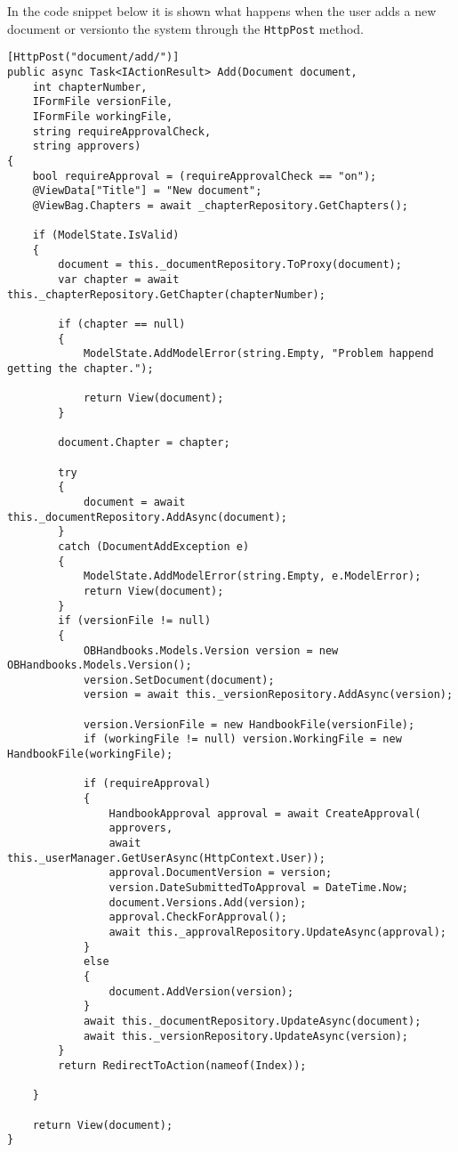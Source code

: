 In the code snippet below it is shown what happens when the user adds a new document or versionto the system through the \texttt{HttpPost} method.
\\
\begin{lstlisting}
[HttpPost("document/add/")]
public async Task<IActionResult> Add(Document document,
	int chapterNumber,
	IFormFile versionFile,
	IFormFile workingFile,
	string requireApprovalCheck,
	string approvers)
{
	bool requireApproval = (requireApprovalCheck == "on");
	@ViewData["Title"] = "New document";
	@ViewBag.Chapters = await _chapterRepository.GetChapters();

	if (ModelState.IsValid)
	{
		document = this._documentRepository.ToProxy(document);
		var chapter = await this._chapterRepository.GetChapter(chapterNumber);

		if (chapter == null)
		{
			ModelState.AddModelError(string.Empty, "Problem happend getting the chapter.");

			return View(document);
		}

		document.Chapter = chapter;

		try
		{
			document = await this._documentRepository.AddAsync(document);
		}
		catch (DocumentAddException e)
		{
			ModelState.AddModelError(string.Empty, e.ModelError);
			return View(document);
		}
		if (versionFile != null)
		{
			OBHandbooks.Models.Version version = new OBHandbooks.Models.Version();
			version.SetDocument(document);
			version = await this._versionRepository.AddAsync(version);

			version.VersionFile = new HandbookFile(versionFile);
			if (workingFile != null) version.WorkingFile = new HandbookFile(workingFile);

			if (requireApproval)
			{
				HandbookApproval approval = await CreateApproval(
				approvers,
				await this._userManager.GetUserAsync(HttpContext.User));
				approval.DocumentVersion = version;
				version.DateSubmittedToApproval = DateTime.Now;
				document.Versions.Add(version);
				approval.CheckForApproval();
				await this._approvalRepository.UpdateAsync(approval);
			}
			else
			{
				document.AddVersion(version);
			}
			await this._documentRepository.UpdateAsync(document);
			await this._versionRepository.UpdateAsync(version);
		}
		return RedirectToAction(nameof(Index));

	}

	return View(document);
}

\end{lstlisting}

